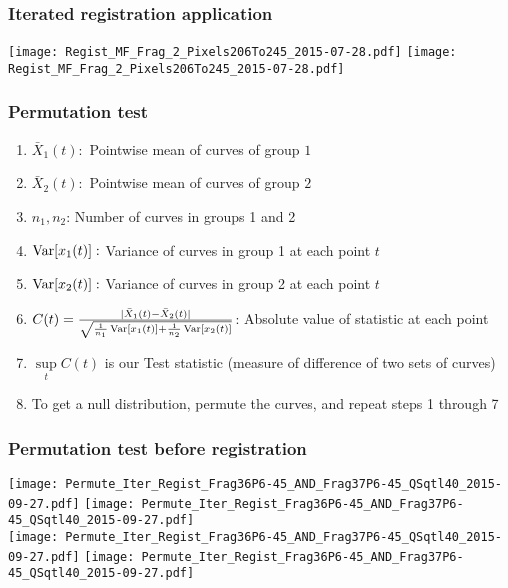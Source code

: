 \documentclass[10pt,dvipsnames,table, notes]{beamer} %
\begin{document}
\begin{frame}
\frametitle{Iterated registration application}
\begin{center}
\texttt{[image: Regist\_MF\_Frag\_2\_Pixels206To245\_2015-07-28.pdf]}
\texttt{[image: Regist\_MF\_Frag\_2\_Pixels206To245\_2015-07-28.pdf]}
\end{center}
\end{frame}

\begin{frame}
\frametitle{Permutation test}
\begin{enumerate}
\item $\bar{X}_1(t): $ Pointwise mean of curves of group $1$
\item $\bar{X}_2(t): $ Pointwise mean of curves of group $2$
\item $n_1, n_2$: Number of curves in groups 1 and 2
\item $\operatorname{Var}[x_1(t)]: $ Variance of curves in group 1 at each point $t$ 
\item $\operatorname{Var}[x_2(t)]: $ Variance of curves in group 2 at each point $t$ 
\item $C(t) = \frac{|\bar{X}_1(t) - \bar{X}_2(t)|}{\sqrt{\frac{1}{n_1}\operatorname{Var}[x_1(t)] + 
\frac{1}{n_2}\operatorname{Var}[x_2(t)]}}$: Absolute value of statistic at each point
\item $\underset{t}{\sup}C(t)$ is our Test statistic (measure of difference of two sets of curves)
\item To get a null distribution, permute the curves, and repeat steps 1 through 7
\end{enumerate}
\end{frame}

\begin{frame}
\frametitle{Permutation test before registration}
\vspace{-0.25cm}
\begin{center}
\texttt{[image: Permute\_Iter\_Regist\_Frag36P6-45\_AND\_Frag37P6-45\_QSqtl40\_2015-09-27.pdf]}
\texttt{[image: Permute\_Iter\_Regist\_Frag36P6-45\_AND\_Frag37P6-45\_QSqtl40\_2015-09-27.pdf]} \\
\texttt{[image: Permute\_Iter\_Regist\_Frag36P6-45\_AND\_Frag37P6-45\_QSqtl40\_2015-09-27.pdf]}
\texttt{[image: Permute\_Iter\_Regist\_Frag36P6-45\_AND\_Frag37P6-45\_QSqtl40\_2015-09-27.pdf]}
\end{center}
\end{frame}
\end{document}
